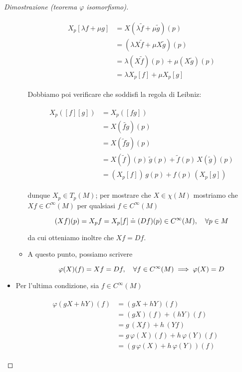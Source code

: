 \begin{proof}[Dimostrazione (teorema $ \varphi $ isomorfismo)]
\begin{itemize}
\begin{itemize}
		\begin{align}
			\begin{split}
				X_{p} [\lambda f + \mu g] &= X (\lambda \tilde{f} + \mu \tilde{g})(p) \\
				&= (\lambda X \tilde{f} + \mu X \tilde{g})(p) \\
				&= \lambda (X \tilde{f})(p) + \mu (X \tilde{g})(p) \\
				&= \lambda X_{p} [f] + \mu X_{p} [g]
			\end{split}
		\end{align}
	
		Dobbiamo poi verificare che soddisfi la regola di Leibniz:
		
		\begin{align}
			\begin{split}
				X_{p} ([f] [g]) &= X_{p} ([f g]) \\
				&= X (\tilde{f g})(p) \\
				&= X (\tilde{f} \tilde{g})(p) \\
				&= X (\tilde{f})(p) \, \tilde{g}(p) + \tilde{f}(p) \, X (\tilde{g})(p) \\
				&= (X_{p} [f]) \, g(p) + f(p) \, (X_{p} [g])
			\end{split}
		\end{align}
	
		dunque $ X_{p} \in T_{p}(M) $; per mostrare che $ X \in \chi(M) $ mostriamo che $ X f \in C^{\infty}(M) $ per qualsiasi $ f \in C^{\infty}(M) $
		
		\begin{equation}
			(X f)(p) = X_{p} f %
			= X_{p} [f] %
			\doteq (D f)(p) \in C^{\infty}(M) %
			\qcomma \forall p \in M
		\end{equation}
	
		da cui otteniamo inoltre che $ X f = D f $.
		
		\item A questo punto, possiamo scrivere
		
		\begin{equation}
			\varphi(X)(f) = X f = D f \qcomma \forall f \in C^{\infty}(M) \implies \varphi(X) = D
		\end{equation}
	\end{itemize}

	
	\item Per l'ultima condizione, sia $ f \in C^{\infty}(M) $
	
	\begin{align}
		\begin{split}
			\varphi(g X + h Y)(f) &= (g X + h Y)(f) \\
			&= (g X)(f) + (h Y)(f) \\
			&= g \, (X f) + h \, (Y f) \\
			&= g \, \varphi(X)(f) + h \, \varphi(Y)(f) \\
			&= (g \, \varphi(X) + h \, \varphi(Y))(f)
		\end{split}
	\end{align}
\end{itemize}


\end{proof}
